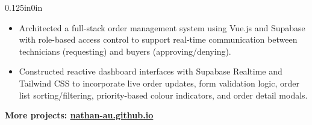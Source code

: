 \documentclass[11pt]{article}
\begin{document}
\begin{adjustwidth}{0.125in}{0in}
        \begin{itemize}
            \item Architected a full-stack order management system using Vue.js and Supabase with role-based access control to support real-time communication between technicians (requesting) and buyers (approving/denying).
            \item Constructed reactive dashboard interfaces with Supabase Realtime and Tailwind CSS to incorporate live order updates, form validation logic, order list sorting/filtering, priority-based colour indicators, and order detail modals.
        \end{itemize}
        \centerline{\textbf{More projects: \href{https://nathan-au.github.io/}{\underline{nathan-au.github.io}}}}
    \end{adjustwidth}
\end{document}
